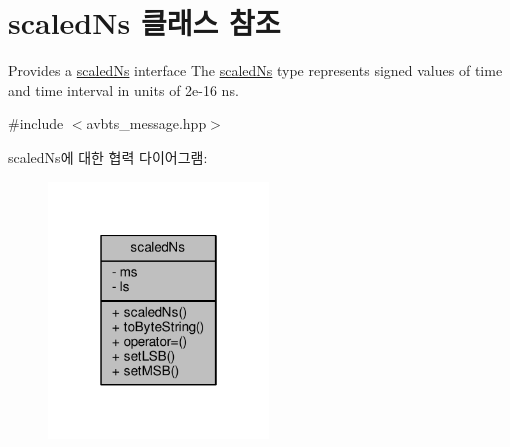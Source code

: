 \hypertarget{classscaled_ns}{}\section{scaled\+Ns 클래스 참조}
\label{classscaled_ns}


Provides a \hyperlink{classscaled_ns}{scaled\+Ns} interface The \hyperlink{classscaled_ns}{scaled\+Ns} type represents signed values of time and time interval in units of 2e-\/16 ns.  




{\ttfamily \#include $<$avbts\+\_\+message.\+hpp$>$}



scaled\+Ns에 대한 협력 다이어그램\+:
\nopagebreak
\begin{figure}[H]
\begin{center}
\leavevmode
\includegraphics[width=166pt]{classscaled_ns__coll__graph}
\end{center}
\end{figure}
